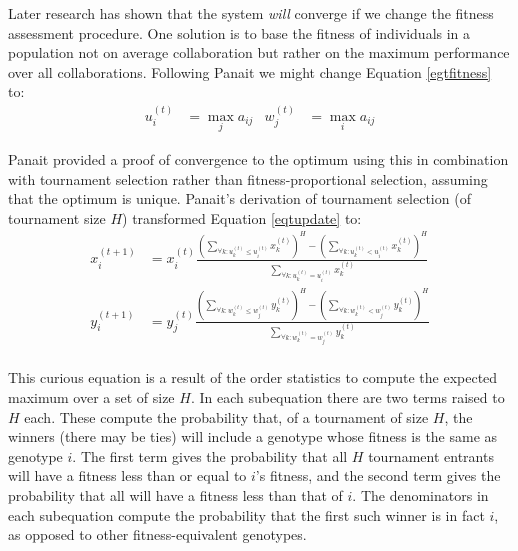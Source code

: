 \documentclass{sig-alt-full}
\begin{document}
Later research has shown that the system {\it will} converge if we change the fitness assessment procedure.  One solution is to base the fitness of individuals in a population not on average collaboration but rather on the maximum performance over all collaborations.  Following Panait \cite{panait06analysis} we might change Equation \ref{egtfitness} to:
%
\begin{align}
\label{panaitfitness}
u_i^{(t)} & = \max_j a_{ij} &
w_j^{(t)} &= \max_i a_{ij}
\end{align}

Panait provided a proof of convergence to the optimum \cite{panait06analysis} using this in combination with tournament selection rather than fitness-proportional selection, assuming that the optimum is unique.
Panait's derivation of tournament selection (of tournament size \(H\)) transformed Equation \ref{eqtupdate} to:
%
\begin{equation}
\label{tournamentselection}
\begin{split}
x_i^{(t+1)} &= x_i^{(t)} \frac{\left(\sum_{\forall k : u_k^{(t)} \leq u_i^{(t)}} x_k^{(t)} \right)^H \!\!\! - \left( \sum_{\forall k : u_k^{(t)} < u_i^{(t)}} x_k^{(t)} \right)^H} {\sum_{\forall k : u_k^{(t)} = u_i^{(t)}} x_k^{(t)}} \\
y_i^{(t+1)} &= y_j^{(t)} \frac{\left( \sum_{\forall k : w_k^{(t)} \leq w_j^{(t)}} y_k^{(t)} \right)^H \!\!\!\! -\left( \sum_{\forall k : w_k^{(t)} < w_j^{(t)}} y_k^{(t)} \right)^H}{\sum_{\forall k : w_k^{(t)} = w_j^{(t)}} y_k^{(t)}} \\
\end{split}
\end{equation}

This curious equation is a result of the order statistics to compute the expected maximum over a set of size \(H\).  In each subequation there are two terms raised to \(H\) each.  These compute the probability that, of a tournament of size \(H\), the winners (there may be ties) will include a genotype whose fitness is the same as genotype \(i\).   The first term gives the probability that all \(H\) tournament entrants will have a fitness less than or equal to \(i\)'s fitness, and the second term gives the probability that all will have a fitness less than that of \(i\).  The denominators in each subequation compute the probability that the first such winner is in fact \(i\), as opposed to other fitness-equivalent genotypes.
\end{document}
